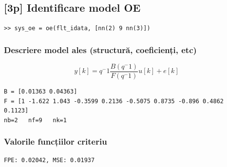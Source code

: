 \documentclass[12pt,english]{article}
\begin{document}
\subsection {[3p] Identificare model OE }

\begin{lstlisting}
>> sys_oe = oe(flt_idata, [nn(2) 9 nn(3)]) 
\end{lstlisting}
\subsubsection {Descriere model ales (structură, coeficienți, etc) }
\[ y[k] = q^-1 \dfrac{B(q^-1)}{F(q^-1)}u[k] + e[k] \]

\begin{lstlisting}
B = [0.01363 0.04363]
F = [1 -1.622 1.043 -0.3599 0.2136 -0.5075 0.8735 -0.896 0.4862 0.1123]
nb=2   nf=9   nk=1
\end{lstlisting}
\subsubsection {Valorile funcțiilor criteriu }
\begin{lstlisting}
FPE: 0.02042, MSE: 0.01937
\end{lstlisting}
\end{document}
